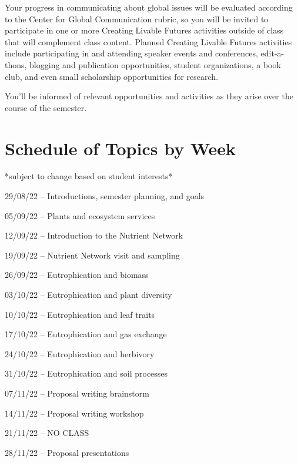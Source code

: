 \documentclass[12pt, notitlepage]{article}   	%
\begin{document}
{Your progress in communicating about global issues will be evaluated according to the 
Center for Global Communication rubric, so you will be invited to participate 
in one or more Creating Livable Futures activities outside of class that will 
complement class content. 
Planned Creating Livable Futures activities include participating in and attending 
speaker events and conferences, edit-a-thons, blogging and publication opportunities, 
student organizations, a book club, and even small scholarship opportunities for research. 

You’ll be informed of relevant opportunities and activities as they arise over 
the course of the semester.

\pagebreak

\section*{Schedule of Topics by Week}
*subject to change based on student interests* \par
29/08/22 – Introductions, semester planning, and goals \par
05/09/22 – Plants and ecosystem services \par
12/09/22 – Introduction to the Nutrient Network \par
19/09/22 – Nutrient Network visit and sampling \par
26/09/22 – Eutrophication and biomass \par
03/10/22 – Eutrophication and plant diversity \par
10/10/22 – Eutrophication and leaf traits \par
17/10/22 – Eutrophication and gas exchange \par
24/10/22 – Eutrophication and herbivory \par
31/10/22 – Eutrophication and soil processes \par
07/11/22 – Proposal writing brainstorm \par
14/11/22 – Proposal writing workshop \par
21/11/22 – NO CLASS \par
28/11/22 – Proposal presentations \par

} %
\end{document}
